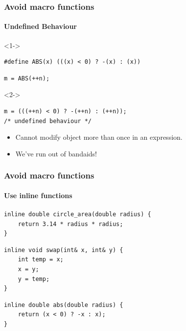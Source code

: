 \documentclass[table]{beamer}
\newcounter{rulecount}
\newcommand{\declarerule}{\textbf{\color{themeblue}{Rule \therulecount:}} }
\begin{document}
\begin{frame}[fragile]
    \frametitle{\declarerule Avoid macro functions}
    \framesubtitle{Undefined Behaviour}
    
\begin{uncoverenv}<1->
\begin{lstlisting}[title=A simple abs macro]
#define ABS(x) (((x) < 0) ? -(x) : (x))
\end{lstlisting}

\begin{lstlisting}[title=You write]
m = ABS(++n); 
\end{lstlisting}
\end{uncoverenv}

\begin{uncoverenv}<2->
\begin{lstlisting}[title=The compiler sees]
m = (((++n) < 0) ? -(++n) : (++n));
/* undefined behaviour */
\end{lstlisting}
    \begin{itemize}
        \item Cannot modify object more than once in an expression.
        \item We've run out of bandaids!
    \end{itemize}
\end{uncoverenv}
\end{frame}

\begin{frame}[fragile]
    \frametitle{\declarerule Avoid macro functions}
    \framesubtitle{Use inline functions}
\begin{lstlisting}[title=\textbf{Better solution:} inline functions]
inline double circle_area(double radius) {
    return 3.14 * radius * radius;
}
\end{lstlisting}

\begin{lstlisting}
inline void swap(int& x, int& y) {
    int temp = x;
    x = y;
    y = temp;
}
\end{lstlisting}

\begin{lstlisting}
inline double abs(double radius) {
    return (x < 0) ? -x : x);
}
\end{lstlisting}

\end{frame}
\end{document}
